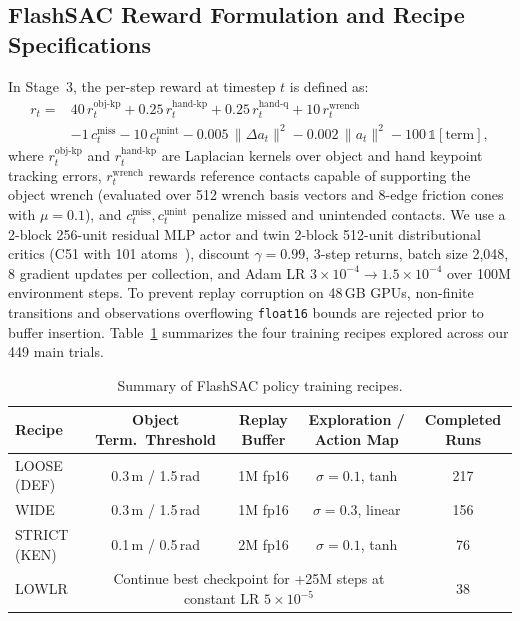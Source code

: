 \documentclass[10pt]{nvidiaextabstract}
\begin{document}
\subsection{FlashSAC Reward Formulation and Recipe Specifications}
\label{app:policy}
In Stage~3, the per-step reward at timestep $t$ is defined as:
\begin{equation}
\label{eq:reward}
\begin{aligned}
r_t ={}& 40\,r^\text{obj-kp}_t + 0.25\,r^\text{hand-kp}_t + 0.25\,r^\text{hand-q}_t + 10\,r^\text{wrench}_t \\
     & - 1\,c^\text{miss}_t - 10\,c^\text{unint}_t - 0.005\,\|\Delta a_t\|^2 - 0.002\,\|a_t\|^2 - 100\,\mathbb{1}[\text{term}],
\end{aligned}
\end{equation}
where $r^\text{obj-kp}_t$ and $r^\text{hand-kp}_t$ are Laplacian kernels over object and hand keypoint tracking errors, $r^\text{wrench}_t$ rewards reference contacts capable of supporting the object wrench (evaluated over 512 wrench basis vectors and 8-edge friction cones with $\mu=0.1$), and $c^\text{miss}_t, c^\text{unint}_t$ penalize missed and unintended contacts. We use a 2-block 256-unit residual MLP actor and twin 2-block 512-unit distributional critics (C51 with 101 atoms~\cite{bellemare2017c51}), discount $\gamma=0.99$, 3-step returns, batch size 2,048, 8 gradient updates per collection, and Adam LR $3\times 10^{-4} \rightarrow 1.5\times 10^{-4}$ over 100M environment steps. To prevent replay corruption on 48\,GB GPUs, non-finite transitions and observations overflowing \texttt{float16} bounds are rejected prior to buffer insertion. Table~\ref{tab:recipes} summarizes the four training recipes explored across our 449 main trials.

\begin{table}[h]
  \centering\small
  \setlength{\tabcolsep}{5pt}
  \begin{tabular}{@{}lcccc@{}}
    \toprule
    \textbf{Recipe} & \textbf{Object Term.\ Threshold} & \textbf{Replay Buffer} & \textbf{Exploration / Action Map} & \textbf{Completed Runs} \\
    \midrule
    LOOSE (DEF) & 0.3\,m / 1.5\,rad & 1M fp16 & $\sigma=0.1$, tanh & 217 \\
    WIDE        & 0.3\,m / 1.5\,rad & 1M fp16 & $\sigma=0.3$, linear & 156 \\
    STRICT (KEN)& 0.1\,m / 0.5\,rad & 2M fp16 & $\sigma=0.1$, tanh & 76 \\
    LOWLR       & \multicolumn{3}{c}{Continue best checkpoint for +25M steps at constant LR $5\times 10^{-5}$} & 38 \\
    \bottomrule
  \end{tabular}
  \caption{Summary of FlashSAC policy training recipes.}
  \label{tab:recipes}
\end{table}
\end{document}

